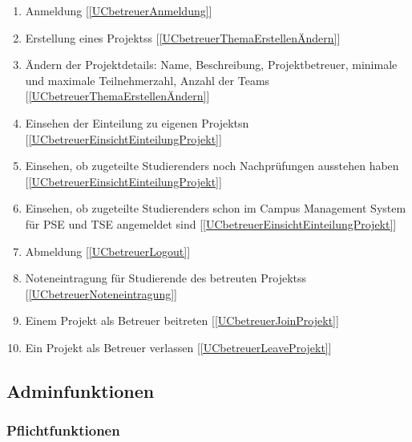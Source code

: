 \documentclass[parskip=full]{scrartcl}
\newcommand{\swtLabel}[1]{\textbf{/#1\arabic*0/}}
\newcommand{\testRef}[1]{[\ref{#1}]}
\begin{document}
\begin{enumerate}[label=\swtLabel{FA}, resume]
  \item Anmeldung  \label{FAbetreuerAnmeldung} \testRef{UCbetreuerAnmeldung}
  \item Erstellung eines \glspl{Projekt}s \label{FAbetreuerAddProjekt}
  \testRef{UCbetreuerThemaErstellenÄndern}
  \item Ändern der Projektdetails: Name, Beschreibung, Projektbetreuer,
        minimale und maximale Teilnehmerzahl, Anzahl der Teams
        \label{FAbetreuerChangeProjekt} \testRef{UCbetreuerThemaErstellenÄndern}%
  \item Einsehen der Einteilung zu eigenen \glspl{Projekt}n
  \label{FAbetreuerEinsichtEinteilung}
  \testRef{UCbetreuerEinsichtEinteilungProjekt}
  \item Einsehen, ob zugeteilte \glspl{Studierender} noch Nachprüfungen
  ausstehen haben \label{FAbetreuerEinsichtNachpruefung} \testRef{UCbetreuerEinsichtEinteilungProjekt}
  \item Einsehen, ob zugeteilte \glspl{Studierender} schon im Campus Management System für \gls{PSE} und TSE angemeldet sind
  \label{FAbetreuerEinsichtTSE} \testRef{UCbetreuerEinsichtEinteilungProjekt}
  \item Abmeldung \label{FAbetreuerAbmeldung} \testRef{UCbetreuerLogout}
  \item Noteneintragung für Studierende des betreuten \glspl{Projekt}s
  \label{FAbetreuerNoten} \testRef{UCbetreuerNoteneintragung}
  \item Einem \gls{Projekt} als Betreuer beitreten \label{FAbetreuerJoinProjekt}
  \testRef{UCbetreuerJoinProjekt}
  \item Ein \gls{Projekt} als Betreuer verlassen \label{FAbetreuerLeaveprojekt}
  \testRef{UCbetreuerLeaveProjekt}

\end{enumerate}

\subsection{Adminfunktionen}

\subsubsection{Pflichtfunktionen}
\end{document}
